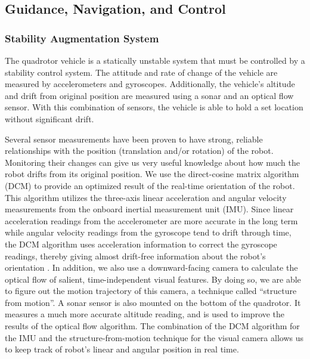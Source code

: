 \documentclass[12pt, letterpaper]{article}
\begin{document}
\subsection{Guidance, Navigation, and Control}
\subsubsection{Stability Augmentation System}

The quadrotor vehicle is a statically unstable system that must be controlled by a stability control system. The attitude and rate of change of the vehicle are measured by accelerometers and gyroscopes. Additionally, the vehicle's altitude and drift from original position are measured using a sonar and an optical flow sensor. With this combination of sensors, the vehicle is able to hold a set location without significant drift.

Several sensor measurements have been proven to have strong, reliable relationships with the position (translation and/or rotation) of the robot. Monitoring their changes can give us very useful knowledge about how much the robot drifts from its original position. We use the direct-cosine matrix algorithm (DCM) to provide an optimized result of the real-time orientation of the robot. This algorithm utilizes the three-axis linear acceleration and angular velocity measurements from the onboard inertial measurement unit (IMU). Since linear acceleration readings from the accelerometer are more accurate in the long term while angular velocity readings from the gyroscope tend to drift through time, the DCM algorithm uses acceleration information to correct the gyroscope readings, thereby giving almost drift-free information about the robot's orientation \cite{bib:dcm}. In addition, we also use a downward-facing camera to calculate the optical flow of salient, time-independent visual features. By doing so, we are able to figure out the motion trajectory of this camera, a technique called ``structure from motion''. A sonar sensor is also mounted on the bottom of the quadrotor. It measures a much more accurate altitude reading, and is used to improve the results of the optical flow algorithm. The combination of the DCM algorithm for the IMU and the structure-from-motion technique for the visual camera allows us to keep track of robot's linear and angular position in real time.
\end{document}
